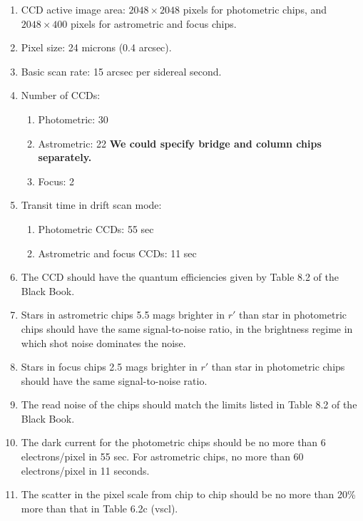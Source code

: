 \begin{enumerate}

\item CCD active image area: $2048\times 2048$ pixels for photometric
chips, and $2048\times 400$ pixels for astrometric and focus chips.

\item Pixel size: 24 microns (0.4 arcsec).

\item Basic scan rate: 15 arcsec per sidereal second.

\item Number of CCDs:
\begin{enumerate}
\item Photometric: 30
\item Astrometric: 22 {\bf We could specify bridge and column chips separately.}
\item Focus: 2
\end{enumerate}

\item Transit time in drift scan mode:
\begin{enumerate}
\item Photometric CCDs: 55 sec
\item Astrometric and focus CCDs: 11 sec
\end{enumerate}

\item The CCD should have the quantum efficiencies given by Table 8.2 of
the Black Book. 

\item Stars in astrometric chips 5.5 mags brighter in $r'$ than
star in photometric chips should have the same signal-to-noise ratio,
in the brightness regime in which shot noise dominates the noise. 

\item Stars in focus chips 2.5 mags  brighter in $r'$ than
star in photometric chips should have the same signal-to-noise ratio. 

\item The read noise of the chips should match the limits listed in
Table 8.2 of the Black Book. 

\item The dark current for the photometric chips should be no more
than 6 electrons/pixel in 55 sec. For astrometric chips, no more than
60 electrons/pixel in 11 seconds.

\item The scatter in the pixel scale from chip to chip
should be no more than 20\% more than that in Table 6.2c (vscl). 


\end{enumerate}

